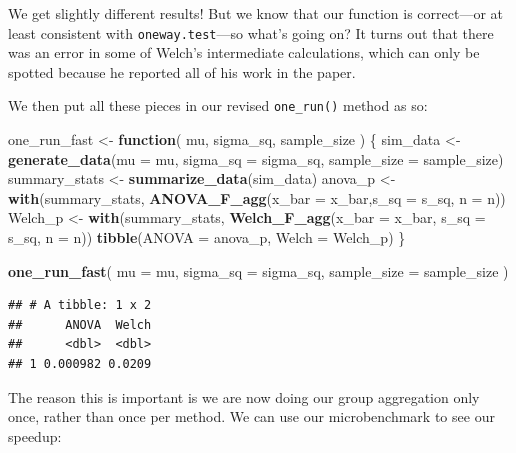 \documentclass[
]{book}
\newenvironment{Shaded}{\begin{snugshade}}{\end{snugshade}}
\newcommand{\AttributeTok}[1]{\textcolor[rgb]{0.13,0.29,0.53}{#1}}
\newcommand{\ControlFlowTok}[1]{\textcolor[rgb]{0.13,0.29,0.53}{\textbf{#1}}}
\newcommand{\FunctionTok}[1]{\textcolor[rgb]{0.13,0.29,0.53}{\textbf{#1}}}
\newcommand{\NormalTok}[1]{#1}
\newcommand{\OtherTok}[1]{\textcolor[rgb]{0.56,0.35,0.01}{#1}}
\begin{document}
We get slightly different results! But we know that our function is correct---or at least consistent with \texttt{oneway.test}---so what's going on? It turns out that there was an error in some of Welch's intermediate calculations, which can only be spotted because he reported all of his work in the paper.

We then put all these pieces in our revised \texttt{one\_run()} method as so:

\begin{Shaded}
\begin{Highlighting}[]
\NormalTok{one\_run\_fast }\OtherTok{\textless{}{-}} \ControlFlowTok{function}\NormalTok{( mu, sigma\_sq, sample\_size ) \{}
\NormalTok{  sim\_data }\OtherTok{\textless{}{-}} \FunctionTok{generate\_data}\NormalTok{(}\AttributeTok{mu =}\NormalTok{ mu, }\AttributeTok{sigma\_sq =}\NormalTok{ sigma\_sq,}
                            \AttributeTok{sample\_size =}\NormalTok{ sample\_size)}
\NormalTok{  summary\_stats }\OtherTok{\textless{}{-}} \FunctionTok{summarize\_data}\NormalTok{(sim\_data)}
\NormalTok{  anova\_p }\OtherTok{\textless{}{-}} \FunctionTok{with}\NormalTok{(summary\_stats, }
                  \FunctionTok{ANOVA\_F\_agg}\NormalTok{(}\AttributeTok{x\_bar =}\NormalTok{ x\_bar,}\AttributeTok{s\_sq =}\NormalTok{ s\_sq, }\AttributeTok{n =}\NormalTok{ n))}
\NormalTok{  Welch\_p }\OtherTok{\textless{}{-}} \FunctionTok{with}\NormalTok{(summary\_stats, }
                  \FunctionTok{Welch\_F\_agg}\NormalTok{(}\AttributeTok{x\_bar =}\NormalTok{ x\_bar, }\AttributeTok{s\_sq =}\NormalTok{ s\_sq, }\AttributeTok{n =}\NormalTok{ n))}
  \FunctionTok{tibble}\NormalTok{(}\AttributeTok{ANOVA =}\NormalTok{ anova\_p, }\AttributeTok{Welch =}\NormalTok{ Welch\_p)}
\NormalTok{\}}

\FunctionTok{one\_run\_fast}\NormalTok{( }\AttributeTok{mu =}\NormalTok{ mu, }\AttributeTok{sigma\_sq =}\NormalTok{ sigma\_sq,}
              \AttributeTok{sample\_size =}\NormalTok{ sample\_size )}
\end{Highlighting}
\end{Shaded}

\begin{verbatim}
## # A tibble: 1 x 2
##      ANOVA  Welch
##      <dbl>  <dbl>
## 1 0.000982 0.0209
\end{verbatim}

The reason this is important is we are now doing our group aggregation only once, rather than once per method. We can use our microbenchmark to see our speedup:
\end{document}
